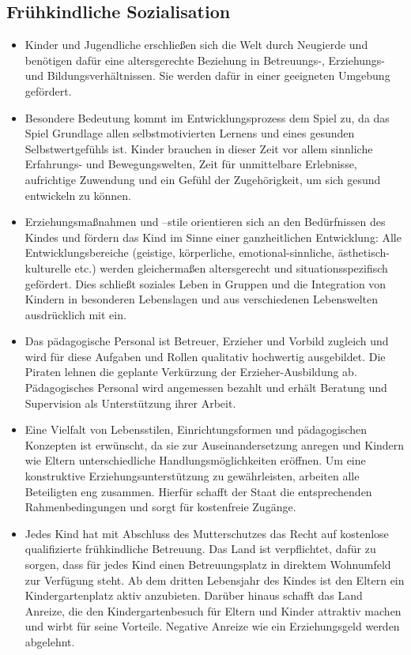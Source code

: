 \documentclass[10pt,a4paper,twocolumn,twoside,titlepage]{article}
\begin{document}
\subsection{Frühkindliche Sozialisation}
\begin{itemize}
\item Kinder und Jugendliche erschließen sich die Welt durch Neugierde und benötigen dafür eine altersgerechte Beziehung in Betreuungs-, Erziehungs- und Bildungsverhältnissen. Sie werden dafür in einer geeigneten Umgebung gefördert.
\item Besondere Bedeutung kommt im Entwicklungsprozess dem Spiel zu, da das Spiel Grundlage allen selbstmotivierten Lernens und eines gesunden Selbstwertgefühls ist.
Kinder brauchen in dieser Zeit vor allem sinnliche Erfahrungs- und Bewegungswelten, Zeit für unmittelbare Erlebnisse, aufrichtige Zuwendung und ein Gefühl der Zugehörigkeit, um sich gesund entwickeln zu können.
\item Erziehungsmaßnahmen und –stile orientieren sich an den Bedürfnissen des Kindes und fördern das Kind im Sinne einer ganzheitlichen Entwicklung: Alle Entwicklungsbereiche (geistige, körperliche, emotional-sinnliche, ästhetisch-kulturelle etc.) werden gleichermaßen altersgerecht und situationsspezifisch gefördert. Dies schließt soziales Leben in Gruppen und die Integration von Kindern in besonderen Lebenslagen und aus verschiedenen Lebenswelten ausdrücklich mit ein.
\item Das pädagogische Personal ist Betreuer, Erzieher und Vorbild zugleich und wird für diese Aufgaben und Rollen qualitativ hochwertig ausgebildet. Die Piraten lehnen die geplante Verkürzung der Erzieher-Ausbildung ab. Pädagogisches Personal wird angemessen bezahlt und erhält Beratung und Supervision als Unterstützung ihrer Arbeit.
\item Eine Vielfalt von Lebensstilen, Einrichtungsformen und pädagogischen Konzepten ist erwünscht, da sie zur Auseinandersetzung anregen und Kindern wie Eltern unterschiedliche Handlungsmöglichkeiten eröffnen. Um eine konstruktive Erziehungsunterstützung zu gewährleisten, arbeiten alle Beteiligten eng zusammen.
Hierfür schafft der Staat die entsprechenden Rahmenbedingungen und sorgt für kostenfreie Zugänge.
\item Jedes Kind hat mit Abschluss des Mutterschutzes das Recht auf kostenlose qualifizierte frühkindliche Betreuung. Das Land ist verpflichtet, dafür zu sorgen, dass für jedes Kind einen Betreuungsplatz in direktem Wohnumfeld zur Verfügung steht.
Ab dem dritten Lebensjahr des Kindes ist den Eltern ein Kindergartenplatz aktiv anzubieten. Darüber hinaus schafft das Land Anreize, die den Kindergartenbesuch für Eltern und Kinder attraktiv machen und wirbt für seine Vorteile. Negative Anreize wie ein Erziehungsgeld werden abgelehnt.
\end{itemize}
\end{document}
